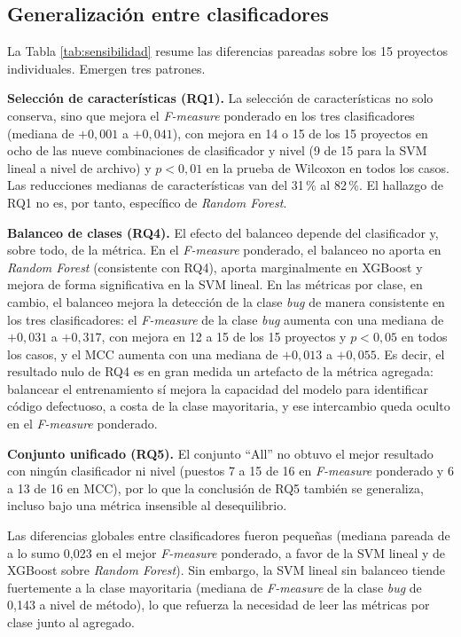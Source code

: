 \subsection{Generalización entre clasificadores}

La Tabla \ref{tab:sensibilidad} resume las diferencias pareadas sobre los 15 proyectos individuales. Emergen tres patrones.

\textbf{Selección de características (RQ1).} La selección de características no solo conserva, sino que mejora el \textit{F-measure} ponderado en los tres clasificadores (mediana de $+0{,}001$ a $+0{,}041$), con mejora en 14 o 15 de los 15 proyectos en ocho de las nueve combinaciones de clasificador y nivel (9 de 15 para la SVM lineal a nivel de archivo) y $p<0{,}01$ en la prueba de Wilcoxon en todos los casos. Las reducciones medianas de características van del 31\,\% al 82\,\%. El hallazgo de RQ1 no es, por tanto, específico de \textit{Random Forest}.

\textbf{Balanceo de clases (RQ4).} El efecto del balanceo depende del clasificador y, sobre todo, de la métrica. En el \textit{F-measure} ponderado, el balanceo no aporta en \textit{Random Forest} (consistente con RQ4), aporta marginalmente en XGBoost y mejora de forma significativa en la SVM lineal. En las métricas por clase, en cambio, el balanceo mejora la detección de la clase \textit{bug} de manera consistente en los tres clasificadores: el \textit{F-measure} de la clase \textit{bug} aumenta con una mediana de $+0{,}031$ a $+0{,}317$, con mejora en 12 a 15 de los 15 proyectos y $p<0{,}05$ en todos los casos, y el MCC aumenta con una mediana de $+0{,}013$ a $+0{,}055$. Es decir, el resultado nulo de RQ4 es en gran medida un artefacto de la métrica agregada: balancear el entrenamiento sí mejora la capacidad del modelo para identificar código defectuoso, a costa de la clase mayoritaria, y ese intercambio queda oculto en el \textit{F-measure} ponderado.

\textbf{Conjunto unificado (RQ5).} El conjunto ``All'' no obtuvo el mejor resultado con ningún clasificador ni nivel (puestos 7 a 15 de 16 en \textit{F-measure} ponderado y 6 a 13 de 16 en MCC), por lo que la conclusión de RQ5 también se generaliza, incluso bajo una métrica insensible al desequilibrio.

Las diferencias globales entre clasificadores fueron pequeñas (mediana pareada de a lo sumo 0,023 en el mejor \textit{F-measure} ponderado, a favor de la SVM lineal y de XGBoost sobre \textit{Random Forest}). Sin embargo, la SVM lineal sin balanceo tiende fuertemente a la clase mayoritaria (mediana de \textit{F-measure} de la clase \textit{bug} de 0,143 a nivel de método), lo que refuerza la necesidad de leer las métricas por clase junto al agregado.

